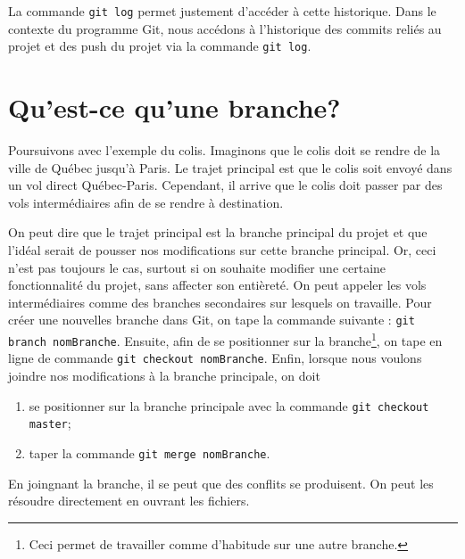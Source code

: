 \documentclass[12pt,a4paper]{article}
\begin{document}
La commande \lstinline!git log! permet justement d'accéder à cette historique. Dans le contexte du programme Git, nous accédons à l'historique des \og commits \fg{} reliés au projet et des \og push \fg{} du projet via la commande \lstinline!git log!.

\section{Qu'est-ce qu'une branche?}

Poursuivons avec l'exemple du colis. Imaginons que le colis doit se rendre de la ville de Québec jusqu'à Paris. Le trajet principal est que le colis soit envoyé dans un vol direct Québec-Paris. Cependant, il arrive que le colis doit passer par des vols intermédiaires afin de se rendre à destination. 

On peut dire que le trajet principal est la branche principal du projet et que l'idéal serait de pousser nos modifications sur cette branche principal. Or, ceci n'est pas toujours le cas, surtout si on souhaite modifier une certaine fonctionnalité du projet, sans affecter son entièreté. On peut appeler les vols intermédiaires comme des branches secondaires sur lesquels on travaille. Pour créer une nouvelles branche dans Git, on tape la commande suivante : \lstinline!git branch nomBranche!. Ensuite, afin de se positionner sur la branche\footnote{Ceci permet de travailler comme d'habitude sur une autre branche.}, on tape en ligne de commande \lstinline!git checkout nomBranche!. Enfin, lorsque nous voulons joindre nos modifications à la branche principale, on doit
	\begin{enumerate}
	\item se positionner sur la branche principale avec la commande \lstinline!git checkout master!;
	\item taper la commande \lstinline!git merge nomBranche!.
	\end{enumerate}
En joingnant la branche, il se peut que des conflits se produisent. On peut les résoudre directement en ouvrant les fichiers.
\end{document}
